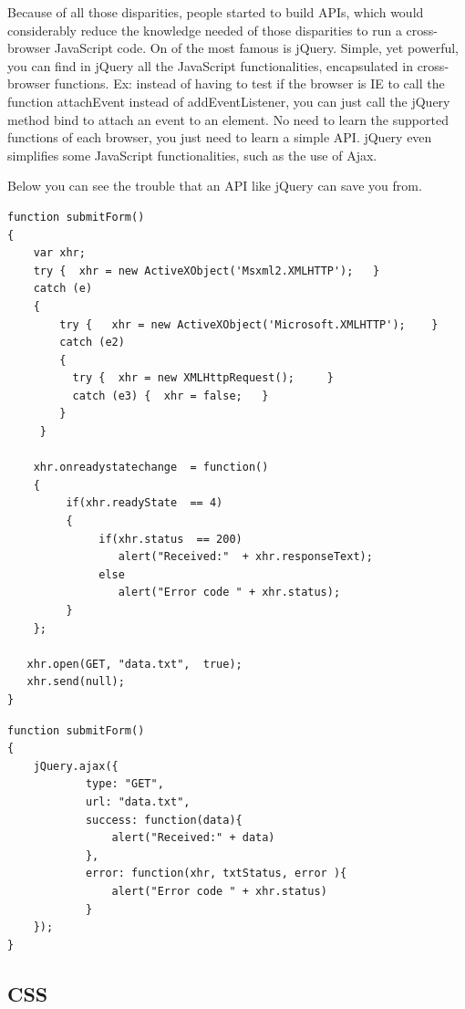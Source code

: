 Because of all those disparities, people started to build APIs, which would considerably reduce the knowledge needed of those disparities to run a cross-browser JavaScript code. On of the most famous is jQuery. Simple, yet powerful, you can find in jQuery all the JavaScript functionalities, encapsulated in cross-browser functions. Ex: instead of having to test if the browser is IE to call the function attachEvent instead of addEventListener, you can just call the jQuery method bind to attach an event to an element. No need to learn the supported functions of each browser, you just need to learn a simple API. jQuery even simplifies some JavaScript functionalities, such as the use of Ajax.

Below you can see the trouble that an API like jQuery can save you from.

\lstset{language=Javascript}
\begin{lstlisting}[label=ajax,caption=Ajax without jQuery]
function submitForm()
{ 
    var xhr; 
    try {  xhr = new ActiveXObject('Msxml2.XMLHTTP');   }
    catch (e) 
    {
        try {   xhr = new ActiveXObject('Microsoft.XMLHTTP');    }
        catch (e2) 
        {
          try {  xhr = new XMLHttpRequest();     }
          catch (e3) {  xhr = false;   }
        }
     }
  
    xhr.onreadystatechange  = function()
    { 
         if(xhr.readyState  == 4)
         {
              if(xhr.status  == 200) 
                 alert("Received:"  + xhr.responseText); 
              else 
                 alert("Error code " + xhr.status);
         }
    }; 

   xhr.open(GET, "data.txt",  true); 
   xhr.send(null); 
} 
\end{lstlisting}


\lstset{language=Javascript}
\begin{lstlisting}[label=ajax-jQuery,caption=Ajax with jQuery]
function submitForm()
{ 
    jQuery.ajax({
			type: "GET",
			url: "data.txt",
			success: function(data){
				alert("Received:" + data)
			},
			error: function(xhr, txtStatus, error ){
				alert("Error code " + xhr.status)	
			}    
    });
} 
\end{lstlisting}

\subsection{CSS}


